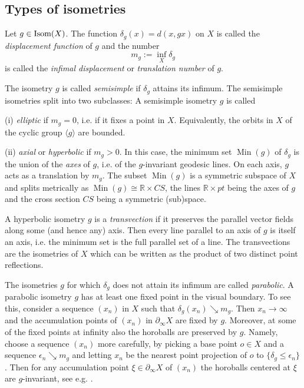 \documentclass[12pt]{article}
\theoremstyle{boldplain}
\theoremstyle{bolddefinition}
\numberwithin{equation}{section}
\def\R{{\mathbb R}}
\def\de{\delta}
\def\eps{\epsilon}
\def\geo{\partial_{\infty}}
\def\Isom{\mathop{\hbox{Isom}}}
\def\Min{\operatorname{Min}}
\def\<{\langle}
\def\>{\rangle}
\begin{document}
\subsection{Types of isometries}
\label{sec:isomsym}

Let $g\in \Isom(X)$.
The function $\de_g(x)=d(x,gx)$ on $X$ is called the {\em displacement function} of $g$
and the number 
\begin{equation*}
m_g:= \inf_X\de_g
\end{equation*}
is called the {\em infimal displacement} or {\em translation number} of $g$.

\medskip 
The isometry $g$ is called {\em semisimple} if $\de_g$ attains its infimum.
The semisimple isometries split into two subclasses:
A semisimple isometry $g$ is called 

(i) {\em elliptic} if $m_g=0$, i.e. if it fixes a point in $X$. 
Equivalently, the orbits in $X$ of the cyclic group $\<g\>$ are bounded. 

(ii) {\em axial} or {\em hyperbolic} if $m_g > 0$. 
In this case, the minimum set $\Min(g)$ of $\de_g$ is the union of the {\em axes} of $g$,
i.e. of the $g$-invariant geodesic lines. 
On each axis, $g$ acts as a translation by $m_g$.
The subset $\Min(g)$ is a symmetric subspace of $X$ and splits metrically as $\Min(g)\cong\R\times CS$,
the lines $\R\times pt$ being the axes of $g$
and the cross section $CS$ being a symmetric (sub)space.

A hyperbolic
isometry $g$ is 
a {\em transvection} 
if it preserves the parallel vector fields along some (and hence any) axis.
Then every line parallel to an axis of $g$ is itself an axis,
i.e. the minimum set is the full parallel set of a line. 
The transvections are the isometries of $X$ which can be written as the product of two distinct point reflections.

\medskip
The isometries $g$ for which $\de_g$ does not attain its infimum
are called {\em parabolic}.
A parabolic isometry $g$ has at least one fixed point in the visual boundary.
To see this,
consider a sequence $(x_n)$ in $X$ such that $\de_g(x_n)\searrow m_g$.
Then $x_n\to\infty$ and the accumulation points of $(x_n)$ in $\geo X$ are fixed by $g$. 
Moreover, at some of the fixed points at infinity also the horoballs are preserved by $g$.
Namely, 
choose a sequence $(x_n)$ more carefully,
by picking a base point $o\in X$ and a sequence {$\eps_n\searrow m_g$ } 
and letting $x_n$ be the nearest point projection of $o$ to $\{\de_g\leq\eps_n\}$.
Then for any accumulation point $\xi\in\geo X$ of $(x_n)$
the horoballs centered at $\xi$ are $g$-invariant,
see e.g. \cite[{Prop. 3.4}]{Ballmann}.
\end{document}
